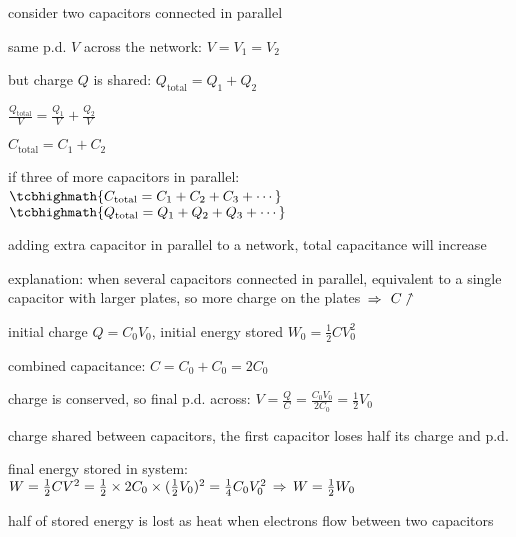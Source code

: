 consider two capacitors connected in parallel

same p.d. $V$ across the network: $V=V_1=V_2$

but charge $Q$ is shared: $Q_\text{total} = Q_1 + Q_2$

{

\centering

$\frac{Q_\text{total}}{V} = \frac{Q_1}{V} + \frac{Q_2}{V}$

$C_\text{total} = C_1 + C_2$

}


if three of more capacitors in parallel: $\tcbhighmath{C_\text{total} = C_1 + C_2 + C_3 + \cdots}$ $\quad$ $\tcbhighmath{Q_\text{total} = Q_1 + Q_2 + Q_3 + \cdots}$

\cmt adding extra capacitor in parallel to a network, total capacitance will increase

explanation: when several capacitors connected in parallel, equivalent to a single capacitor with larger plates, so more charge on the plates $\, \Rightarrow \,$ $C\nnearrow$


\begin{soln} initial charge $Q=C_0 V_0$, initial energy stored $W_0 = \frac{1}{2} C V_0^2$

combined capacitance: $C= C_0 + C_0 = 2C_0$

charge is conserved, so final p.d. across: $V = \frac{Q}{C} = \frac{C_0 V_0}{2C_0} = \frac{1}{2} V_0$


charge shared between capacitors, the first capacitor loses half its charge and p.d.

final energy stored in system: $W = \frac{1}{2}CV^2 = \frac{1}{2} \times 2C_0 \times (\frac{1}{2}V_0)^2 = \frac{1}{4} C_0 V_0^2 \, \Rightarrow \, W = \frac{1}{2} W_0$

half of stored energy is lost as heat when electrons flow between two capacitors \end{soln}



\newpage

